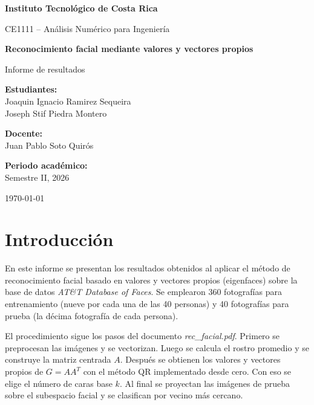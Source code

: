 \documentclass[12pt, letterpaper]{article}
\newcommand{\universidad}{Instituto Tecnológico de Costa Rica}
\newcommand{\curso}{CE1111 -- Análisis Numérico para Ingeniería}
\newcommand{\titulo}{Reconocimiento facial mediante valores y vectores propios}
\newcommand{\estudiantes}{%
    Joaquin Ignacio Ramirez Sequeira\\
    Joseph Stif Piedra Montero%
}
\newcommand{\profesor}{Juan Pablo Soto Quirós}
\newcommand{\semestre}{Semestre II, 2026}
\newcommand{\fecha}{\today}
\begin{document}
\begin{titlepage}
    \centering
    \vspace*{1cm}
    {\Large\textbf{\universidad}\par}
    \vspace{1.5cm}
    \vspace{1cm}
    {\large\curso\par}
    \vspace{2cm}
    {\LARGE\bfseries \titulo\par}
    \vspace{0.8cm}
    {\large Informe de resultados\par}
    \vspace{2cm}
    \begin{flushleft}
        \textbf{Estudiantes:}\\
        \estudiantes
        \vspace{0.6cm}

        \textbf{Docente:}\\
        \profesor
        \vspace{0.6cm}

        \textbf{Periodo académico:}\\
        \semestre
    \end{flushleft}
    \vfill
    {\large \fecha\par}
\end{titlepage}

\tableofcontents
\newpage

\section{Introducción}

En este informe se presentan los resultados obtenidos al aplicar
el método de reconocimiento facial basado en valores y vectores
propios (eigenfaces) sobre la base de datos \textit{AT\&T Database
of Faces}. Se emplearon 360 fotografías para entrenamiento
(nueve por cada una de las 40 personas) y 40 fotografías para
prueba (la décima fotografía de cada persona).

El procedimiento sigue los pasos del documento \textit{rec\_facial.pdf}.
Primero se preprocesan las imágenes y se vectorizan. Luego se calcula el
rostro promedio y se construye la matriz centrada $A$. Después se obtienen
los valores y vectores propios de $G = AA^{T}$ con el método QR implementado
desde cero. Con eso se elige el número de caras base $k$. Al final se
proyectan las imágenes de prueba sobre el subespacio facial y se clasifican
por vecino más cercano.
\end{document}
